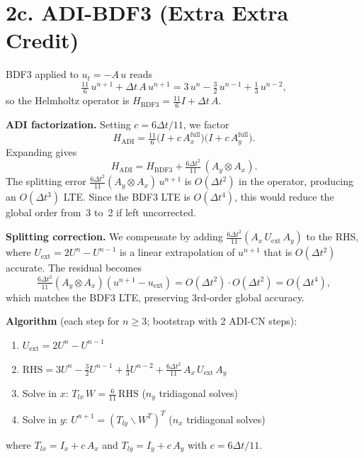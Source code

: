\documentclass[11pt]{article}
\begin{document}
\newpage
\section*{2c. ADI-BDF3 (Extra Extra Credit)}

BDF3 applied to $u_t = -A\,u$ reads
\[
  \tfrac{11}{6}\,u^{n+1} + \Delta t\,A\,u^{n+1}
  = 3\,u^n - \tfrac{3}{2}\,u^{n-1} + \tfrac{1}{3}\,u^{n-2},
\]
so the Helmholtz operator is $H_{\mathrm{BDF3}} = \tfrac{11}{6}I + \Delta t\,A$.

\medskip\noindent\textbf{ADI factorization.}
Setting $c = 6\Delta t/11$, we factor
\[
  H_{\mathrm{ADI}} = \tfrac{11}{6}
    \bigl(I + c\,A_x^{\mathrm{full}}\bigr)
    \bigl(I + c\,A_y^{\mathrm{full}}\bigr).
\]
Expanding gives
\[
  H_{\mathrm{ADI}} = H_{\mathrm{BDF3}}
    + \tfrac{6\Delta t^2}{11}\,(A_y \otimes A_x).
\]
The splitting error $\tfrac{6\Delta t^2}{11}(A_y \otimes A_x)\,u^{n+1}$
is $O(\Delta t^2)$ in the operator, producing an $O(\Delta t^3)$ LTE.
Since the BDF3 LTE is $O(\Delta t^4)$, this would reduce the global order
from~3 to~2 if left uncorrected.

\medskip\noindent\textbf{Splitting correction.}
We compensate by adding $\tfrac{6\Delta t^2}{11}(A_x\,U_{\mathrm{ext}}\,A_y)$
to the RHS, where $U_{\mathrm{ext}} = 2U^n - U^{n-1}$ is a linear
extrapolation of $u^{n+1}$ that is $O(\Delta t^2)$ accurate.
The residual becomes
\[
  \tfrac{6\Delta t^2}{11}(A_y \otimes A_x)(u^{n+1} - u_{\mathrm{ext}})
  = O(\Delta t^2) \cdot O(\Delta t^2) = O(\Delta t^4),
\]
which matches the BDF3 LTE, preserving 3rd-order global accuracy.

\medskip\noindent\textbf{Algorithm} (each step for $n \ge 3$; bootstrap with 2 ADI-CN steps):
\begin{enumerate}[nosep]
  \item $U_{\mathrm{ext}} = 2U^n - U^{n-1}$
  \item $\mathrm{RHS} = 3U^n - \tfrac{3}{2}U^{n-1} + \tfrac{1}{3}U^{n-2}
         + \tfrac{6\Delta t^2}{11}\,A_x\,U_{\mathrm{ext}}\,A_y$
  \item Solve in $x$: $T_{lx}\,W = \tfrac{6}{11}\,\mathrm{RHS}$
        \quad($n_y$ tridiagonal solves)
  \item Solve in $y$: $U^{n+1} = (T_{ly} \backslash W^T)^T$
        \quad($n_x$ tridiagonal solves)
\end{enumerate}
where $T_{lx} = I_x + c\,A_x$ and $T_{ly} = I_y + c\,A_y$ with $c = 6\Delta t/11$.
\end{document}
